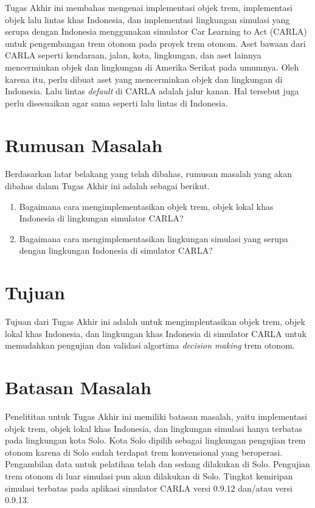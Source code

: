 Tugas Akhir ini membahas mengenai implementasi objek trem, implementasi objek
lalu lintas khas Indonesia, dan implementasi lingkungan simulasi yang serupa
dengan Indonesia menggunakan simulator Car Learning to Act (CARLA) untuk
pengembangan trem otonom pada proyek trem otonom. Aset bawaan dari CARLA seperti
kendaraan, jalan, kota, lingkungan, dan aset lainnya mencerminkan objek dan
lingkungan di Amerika Serikat pada umumnya. Oleh karena itu, perlu dibuat aset
yang mencerminkan objek dan lingkungan di Indonesia. Lalu lintas
\textit{default} di CARLA adalah jalur kanan. Hal tersebut juga perlu
disesuaikan agar sama seperti lalu lintas di Indonesia.

\section{Rumusan Masalah}

Berdasarkan latar belakang yang telah dibahas, rumusan masalah yang akan dibahas
dalam Tugas Akhir ini adalah sebagai berikut.

\begin{enumerate}

    \item Bagaimana cara mengimplementasikan objek trem, objek lokal khas
    Indonesia di lingkungan simulator CARLA?

    \item Bagaimana cara mengimplementasikan lingkungan simulasi yang serupa
    dengan lingkungan Indonesia di simulator CARLA?

\end{enumerate}

\section{Tujuan}

Tujuan dari Tugas Akhir ini adalah untuk mengimplentasikan objek trem, objek
lokal khas Indonesia, dan lingkungan khas Indonesia di simulator CARLA untuk
memudahkan pengujian dan validasi algortima \textit{decision making} trem
otonom.

\section{Batasan Masalah}

Penelititan untuk Tugas Akhir ini memiliki batasan masalah, yaitu implementasi
objek trem, objek lokal khas Indonesia, dan lingkungan simulasi hanya terbatas
pada lingkungan kota Solo. Kota Solo dipilih sebagai lingkungan pengujian trem
otonom karena di Solo sudah terdapat trem konvensional yang beroperasi.
Pengambilan data untuk pelatihan telah dan sedang dilakukan di Solo. Pengujian
trem otonom di luar simulasi pun akan dilakukan di Solo. Tingkat kemiripan
simulasi terbatas pada aplikasi simulator CARLA versi 0.9.12 dan/atau versi
0.9.13.

